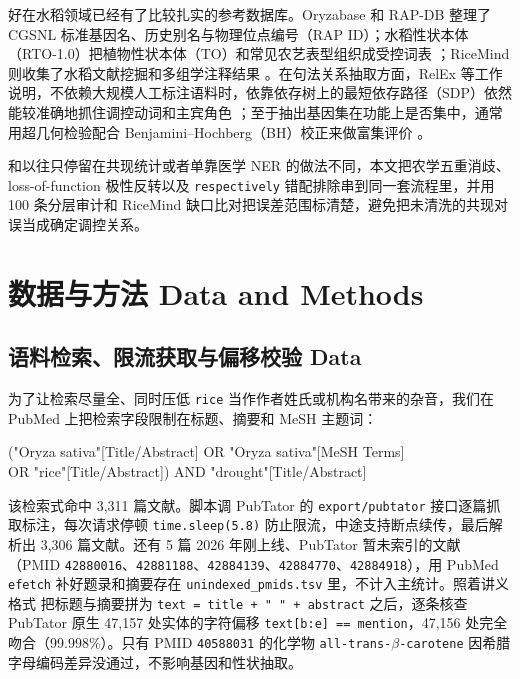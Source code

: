 \documentclass[conference]{IEEEtran}
\begin{document}
好在水稻领域已经有了比较扎实的参考数据库。Oryzabase 和 RAP-DB 整理了 CGSNL 标准基因名、历史别名与物理位点编号（RAP ID）\cite{kurata2006oryzabase,sakai2013rapdb}；水稻性状本体（RTO-1.0）把植物性状本体（TO）和常见农艺表型组织成受控词表 \cite{rto2026}；RiceMind 则收集了水稻文献挖掘和多组学注释结果 \cite{ricemind2024}。在句法关系抽取方面，RelEx 等工作说明，不依赖大规模人工标注语料时，依靠依存树上的最短依存路径（SDP）依然能较准确地抓住调控动词和主宾角色 \cite{fundel2007}；至于抽出基因集在功能上是否集中，通常用超几何检验配合 Benjamini--Hochberg（BH）校正来做富集评价 \cite{ashburner2000,huang2009,benjamini1995bh}。

和以往只停留在共现统计或者单靠医学 NER 的做法不同，本文把农学五重消歧、loss-of-function 极性反转以及 \texttt{respectively} 错配排除串到同一套流程里，并用 100 条分层审计和 RiceMind 缺口比对把误差范围标清楚，避免把未清洗的共现对误当成确定调控关系。

\section{数据与方法 Data and Methods}

\subsection{语料检索、限流获取与偏移校验 Data}
为了让检索尽量全、同时压低 \texttt{rice} 当作作者姓氏或机构名带来的杂音，我们在 PubMed 上把检索字段限制在标题、摘要和 MeSH 主题词：
\begin{center}
\vspace{-2pt}
\footnotesize\ttfamily ("Oryza sativa"[Title/Abstract] OR "Oryza sativa"[MeSH Terms]\\
OR "rice"[Title/Abstract]) AND "drought"[Title/Abstract]
\vspace{-2pt}
\end{center}
该检索式命中 3,311 篇文献。脚本调 PubTator 的 \texttt{export/pubtator} 接口逐篇抓取标注，每次请求停顿 \texttt{time.sleep(5.8)} 防止限流，中途支持断点续传，最后解析出 3,306 篇文献。还有 5 篇 2026 年刚上线、PubTator 暂未索引的文献（PMID \texttt{42880016}、\texttt{42881188}、\texttt{42884139}、\texttt{42884770}、\texttt{42884918}），用 PubMed \texttt{efetch} 补好题录和摘要存在 \texttt{unindexed\_pmids.tsv} 里，不计入主统计。照着讲义格式 \cite{slides2026} 把标题与摘要拼为 \texttt{text = title + " " + abstract} 之后，逐条核查 PubTator 原生 47,157 处实体的字符偏移 \texttt{text[b:e] == mention}，47,156 处完全吻合（99.998\%）。只有 PMID \texttt{40588031} 的化学物 \texttt{all-trans-$\beta$-carotene} 因希腊字母编码差异没通过，不影响基因和性状抽取。
\end{document}
